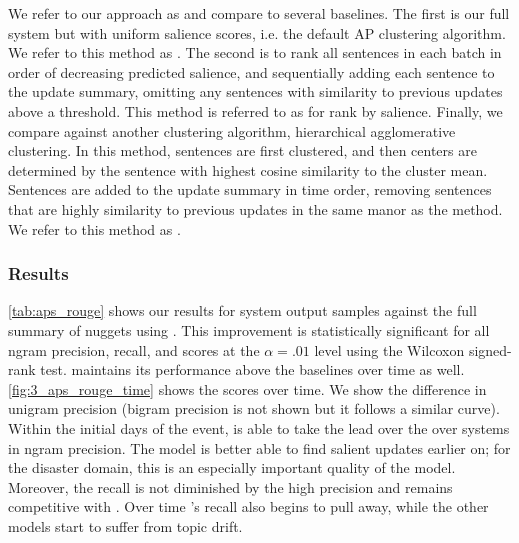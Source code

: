     We refer to our approach as \sap{} and compare to 
    several 
    baselines.
    The first is our full system but with uniform salience scores, i.e.
    the default AP clustering algorithm. We refer to
    this method as \ap.
    The second is to rank all sentences in each batch in order of decreasing
    predicted
    salience, and sequentially adding each sentence to the update summary, 
    omitting
    any sentences with similarity to previous updates above a threshold.
    This method is referred to as \ranksal{} for rank by salience.
    Finally, we compare against another clustering algorithm,
    hierarchical agglomerative clustering.
    In this method, sentences are first clustered, 
    and then centers are determined by the sentence
    with  highest  cosine  similarity  to  the  cluster
    mean. 
    Sentences are added to the update summary in time order, 
    removing sentences that are highly similarity to previous updates in the
    same manor as the \ranksal{} method. We refer to this method as 
    \hac.





    \subsubsection{Results}

\autoref{tab:aps_rouge}  shows  our  results  for  system  output
samples against the full summary of nuggets using \rouge. 
This improvement is statistically significant  for  all  ngram  
precision,  recall,  and \fmeasure{} scores at the
$\alpha=.01$
level using the Wilcoxon
signed-rank test.
\sap{}
maintains    its    performance
above  the  baselines  over  time  as  well.
\autoref{fig:3_aps_rouge_time}  shows  the    scores  over  
time.
We  show  the  difference  in  unigram  precision
(bigram  precision  is  not  shown  but  it  follows a
similar  curve).
Within  the  initial  days  of  the
event,  \sap{}
is  able  to  take  the  lead
over  the  over  systems  in  ngram  precision.   The
\sap{}
model is better able to find salient
updates earlier on; for the disaster domain, this is
an especially important quality of the model.
Moreover, the \sap{} recall is not diminished by the high 
precision and remains competitive with \ap. 
Over time \sap's recall also begins to pull away, 
while the other models start to suffer from topic drift.



